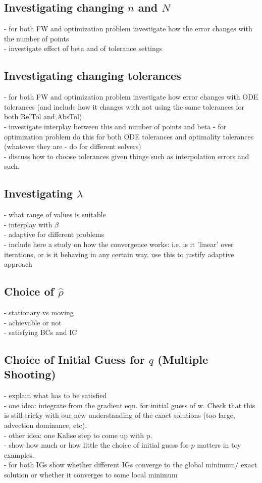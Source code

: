 \documentclass[11pt, a4paper]{article}
\theoremstyle{definition}
\newcommand{\adj}{q}
\begin{document}
\subsection{Investigating changing $n$ and $N$}
- for both FW and optimization problem investigate how the error changes with the number of points\\
- investigate effect of beta and of tolerance settings\\

\subsection{Investigating changing tolerances}
- for both FW and optimization problem investigate how error changes with ODE tolerances (and include how it changes with not using the same tolerances for both RelTol and AbsTol)\\
- investigate interplay between this and number of points and beta
- for optimization problem do this for both ODE tolerances and optimality tolerances (whatever they are - do for different solvers)\\
- discuss how to choose tolerances given things such as interpolation errors and such.


\subsection{Investigating $\lambda$}
- what range of values is suitable\\
- interplay with $\beta$\\
- adaptive for different problems\\
- include here a study on how the convergence works: i.e. is it 'linear' over iterations, or is it behaving in any certain way. use this to justify adaptive approach
\subsection{Choice of $\hat \rho$}
- stationary vs moving\\
- achievable or not\\
- satisfying BCs and IC
\subsection{Choice of Initial Guess for $\adj$ (Multiple Shooting)}
- explain what has to be satisfied\\
- one idea: integrate from the gradient eqn. for initial guess of w. Check that this is still tricky with our new understanding of the exact solutions (too large, advection dominance, etc). \\
- other idea: one Kalise step to come up with p.\\
- show how much or how little the choice of initial guess for $p$ matters in toy examples.\\
- for both IGs show whether different IGs converge to the global minimum/ exact solution or whether it converges to some local minimum
\end{document}
